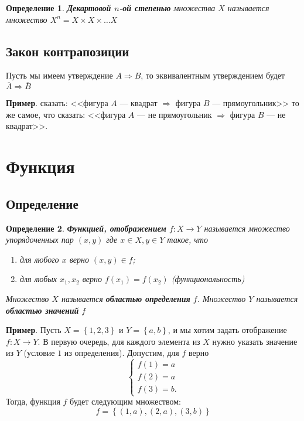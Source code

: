 \documentclass[]{article}
\newtheorem{dfn}{Определение}
\begin{document}
	\begin{dfn}
	\textbf{Декартовой $n$-ой степенью} множества $X$ называется множество $X^n=X\times X\times \ldots X$ 
	\end{dfn}
	
	\subsection{Закон контрапозиции}
	
	Пусть мы имеем утверждение $A\Rightarrow B$, то эквивалентным утверждением будет $\overline{A}\Rightarrow \overline{B}$
	
	\textbf{Пример}. сказать: <<фигура $A$ --- квадрат $\Rightarrow$ фигура $B$ --- прямоугольник>> то же самое, что сказать: <<фигура $A$ --- не прямоугольник $\Rightarrow$ фигура $B$ --- не квадрат>>.
	
	\section{Функция}
	\subsection{Определение}
	\begin{dfn}
		\textbf{Функцией, отображением} $f:X\rightarrow Y$ называется множество  упорядоченных пар $(x,y)$ где $x\in X, y\in Y$ такое, что 
		\begin{enumerate}
			\item для любого $x$ верно  $(x,y)\in f$; 
			\item для любых $x_1, x_2$ верно  $f(x_1)=f(x_2)$
			(функциональность)
		\end{enumerate}
		Множество $X$ называется \textbf{областью определения} $f$.
		Множество $Y$ называется \textbf{областью значений} $f$
	\end{dfn}
	\textbf{Пример}. Пусть $X=\left\{1,2,3\right\}$ и $Y=\left\{a,b\right\}$, и мы хотим задать отображение $f:X\rightarrow Y$. В первую очередь, для каждого элемента из $X$ нужно указать значение из $Y$ (условие $1$ из определения). Допустим, для $f$ верно
	\begin{equation}
	\begin{cases}
	f(1)=a
	\\
	f(2)=a
	\\
	f(3)=b.
\end{cases}
	\end{equation}
Тогда, функция $f$ будет следующим множеством:
\begin{equation}
	f=\left\{(1,a),(2,a),(3,b)\right\}
\end{equation}
\end{document}
